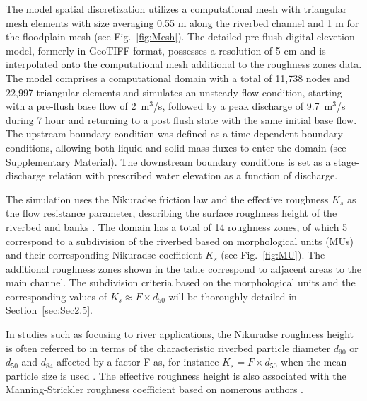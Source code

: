 \documentclass[draft,linenumbers,onecolumn]{agujournal2019} %
\begin{document}
The model spatial discretization utilizes a computational mesh with triangular mesh elements with size averaging 0.55 m along the riverbed channel and 1 m for the floodplain mesh (see Fig.~\ref{fig:Mesh}). The detailed pre flush digital elevetion model, formerly in GeoTIFF format, possesses a resolution of 5 cm and is interpolated onto the computational mesh additional to the roughness zones data. The model comprises a computational domain with a total of 11,738 nodes and 22,997 triangular elements and simulates an unsteady flow condition, starting with a pre-flush base flow of 2~m$^3$/s, followed by a peak discharge of 9.7~m$^3$/s during 7 hour and returning to a post flush state with the same initial base flow. The upstream boundary condition was defined as a time-dependent boundary conditions, allowing both liquid and solid mass fluxes to enter the domain (see Supplementary Material). 
The downstream boundary conditions is set as a stage-discharge relation with prescribed water elevation as a function of discharge. 

The simulation uses the Nikuradse friction law and the effective roughness \(K_{s}\) as the flow resistance parameter, describing the surface roughness height of the riverbed and banks \cite{nikuradse1933stroemungsgesetze,marriott2010hydraulic,webber2018fluid,hervouet2020telemac2d}. The domain has a total of 14 roughness zones, of which 5 correspond to a subdivision of the riverbed based on morphological units (MUs) and their corresponding Nikuradse coefficient \(K_{s}\) (see Fig.~\ref{fig:MU}). The additional roughness zones shown in the table correspond to adjacent areas to the main channel. The subdivision criteria based on the morphological units and the corresponding values of \( K_{s} \approx F \times d_{50} \) will be thoroughly detailed in Section~\ref{sec:Sec2.5}.




In studies such as \cite{meyer-peter1948formulas, ferguson2007flow, rickenmann2011evaluation} focusing to river applications, the Nikuradse roughness height is often referred to in terms of the characteristic riverbed particle diameter \(d_{90}\) or \(d_{50}\) and \(d_{84}\) affected by a factor F as, for instance \( K_{s} = F \times d_{50} \) when the mean particle size is used \cite{meyer-peter1948formulas,tassi2023gaia}. The effective roughness height is also associated with the Manning-Strickler roughness coefficient based on nomerous authors \cite{meyer-peter1948formulas,smart1999coefficient,ferguson2007flow}.
\end{document}
